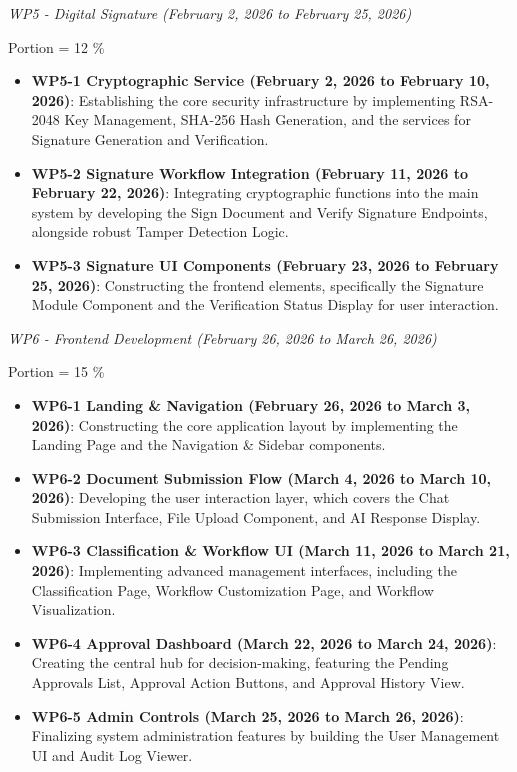 \documentclass[12pt,oneside,openright,a4paper]{cpe-english-project}
\begin{document}
\vspace{1em}

\emph{WP5 - Digital Signature (February 2, 2026 to February 25, 2026)}

Portion = 12 \%

\begin{itemize}
\item \textbf{WP5-1 Cryptographic Service (February 2, 2026 to February 10, 2026)}: Establishing the core security infrastructure by implementing RSA-2048 Key Management, SHA-256 Hash Generation, and the services for Signature Generation and Verification.
\item \textbf{WP5-2 Signature Workflow Integration (February 11, 2026 to February 22, 2026)}: Integrating cryptographic functions into the main system by developing the Sign Document and Verify Signature Endpoints, alongside robust Tamper Detection Logic.
\item \textbf{WP5-3 Signature UI Components (February 23, 2026 to February 25, 2026)}: Constructing the frontend elements, specifically the Signature Module Component and the Verification Status Display for user interaction.
\end{itemize}

\vspace{1em}

\emph{WP6 - Frontend Development (February 26, 2026 to March 26, 2026)}

Portion = 15 \%

\begin{itemize}
\item \textbf{WP6-1 Landing \& Navigation (February 26, 2026 to March 3, 2026)}: Constructing the core application layout by implementing the Landing Page and the Navigation \& Sidebar components.
\item \textbf{WP6-2 Document Submission Flow (March 4, 2026 to March 10, 2026)}: Developing the user interaction layer, which covers the Chat Submission Interface, File Upload Component, and AI Response Display.
\item \textbf{WP6-3 Classification \& Workflow UI (March 11, 2026 to March 21, 2026)}: Implementing advanced management interfaces, including the Classification Page, Workflow Customization Page, and Workflow Visualization.
\item \textbf{WP6-4 Approval Dashboard (March 22, 2026 to March 24, 2026)}: Creating the central hub for decision-making, featuring the Pending Approvals List, Approval Action Buttons, and Approval History View.
\item \textbf{WP6-5 Admin Controls (March 25, 2026 to March 26, 2026)}: Finalizing system administration features by building the User Management UI and Audit Log Viewer.
\end{itemize}
\end{document}
